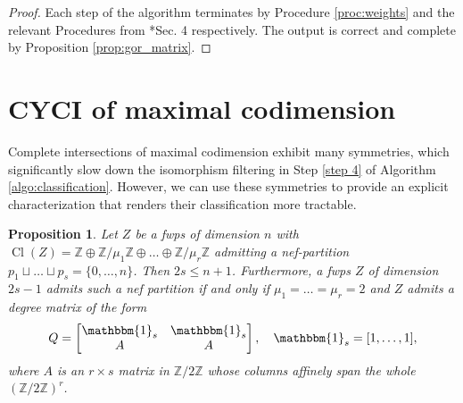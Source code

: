 \documentclass{amsart}
\DeclareMathOperator{\Cl}{Cl}
\newcommand{\Z}{\mathbb{Z}}
\newtheorem{proposition}[lem]{Proposition}
\theoremstyle{definition}
\begin{document}
\begin{proof}
    Each step of the algorithm terminates by Procedure \ref{proc:weights} and the relevant Procedures from \cite{Ghi}*{Sec. 4} respectively. The output is correct and complete by Proposition \ref{prop:gor_matrix}.    
\end{proof}

\section{CYCI of maximal codimension}\label{sec:maximal codimension}

Complete intersections of maximal codimension exhibit many symmetries, which significantly slow down the isomorphism filtering in Step \ref{step 4} of Algorithm \ref{algo:classification}.  However, we can use these symmetries to provide an explicit characterization that renders their classification more tractable.

\begin{proposition}\label{prop:maximal codimension}
    Let $Z$ be a fwps of dimension $n$ with $\Cl(Z)=\Z\oplus \Z/\mu_1\Z\oplus\dots\oplus\Z/\mu_r\Z$ admitting a nef-partition $p_1\sqcup\dots\sqcup p_s=\{0,\dots,n\}$. Then $2s\leq n+1$. Furthermore, a fwps $Z$ of dimension $2s-1$ admits such a nef partition if and only if $\mu_1=\dots=\mu_r=2$ and $Z$ admits a degree matrix of the form
    $$
    Q = \begin{bmatrix}
    \mathbbm{1}_{s} & \mathbbm{1}_s \\
    A & A
    \end{bmatrix},\quad \mathbbm{1}_s=[1,\dots,1],
    $$
    where $A$ is an $r\times s$ matrix in $\Z/2\Z$ whose columns affinely span the whole $(\Z/2\Z)^r$.
\end{proposition}
\end{document}
